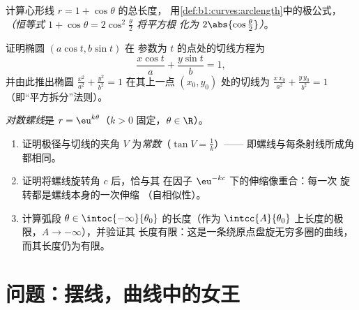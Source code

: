 \begin{exercise}[$\star\star$]\label{exo:b1:curves:10}
计算心形线 $r = 1 + \cos\theta$ 的总长度，
用\cref{def:b1:curves:arclength}中的极公式，
\emph{（恒等式 $1 + \cos\theta = 2\cos^2\frac\theta2$ 将平方根
化为 $2\abs{\cos\frac\theta2}$）}。
\end{exercise}

\begin{exercise}[$\star\star$]\label{exo:b1:curves:11}
证明椭圆 $(a\cos t, b\sin t)$ 在
参数为 $t$ 的点处的切线方程为
\[
\frac{x\cos t}{a} + \frac{y\sin t}{b} = 1 ,
\]
并由此推出椭圆 $\frac{x^2}{a^2} + \frac{y^2}{b^2} = 1$
在其上一点 $(x_0, y_0)$ 处的切线为 $\frac{x\,x_0}{a^2} +
\frac{y\,y_0}{b^2} = 1$（即“平方拆分”法则）。
\end{exercise}

\begin{exercise}[$\star\star\star$]\label{exo:b1:curves:12}
\emph{对数螺线}是 $r =
\eu^{k\theta}$（$k > 0$ 固定，$\theta \in \R$）。
\begin{enumerate}
  \item 证明极径与切线的夹角 $V$
        为\emph{常数}（$\tan V = \frac1k$）——
        即螺线与每条射线所成角都相同。
  \item 证明将螺线旋转角 $c$ 后，恰与其
        在因子 $\eu^{-kc}$ 下的伸缩像重合：每一次
        旋转都是螺线本身的一次伸缩
        （自相似性）。
  \item 计算弧段 $\theta \in
        \intoc{-\infty}{\theta_0}$ 的长度（作为
        $\intcc{A}{\theta_0}$ 上长度的极限，$A \to -\infty$），并验证其
        长度有限：这是一条绕原点盘旋无穷多圈的曲线，
        而其长度仍为有限。
\end{enumerate}
\end{exercise}

\section{问题：摆线，曲线中的女王}

